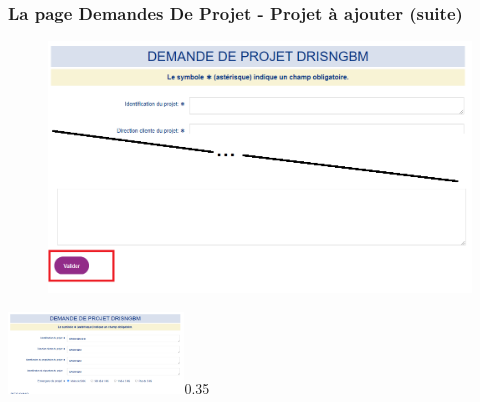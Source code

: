 \documentclass[aspectratio=169]{beamer}%
\let\note\relax
\begin{document}
\begin{frame}
\transwipe 
\label{pictures}
\frametitle{La page Demandes De Projet - Projet à ajouter (suite)}

\begin{figure}
\includegraphics[scale=0.33]{form_valider}
\end{figure}
\end{frame}
\begin{frame}
\transwipe 
  \centering
    \begin{annotate}{\includegraphics[width=0.35\textwidth]{Projet_a_soumettre}}{0.35}
        
    \end{annotate}
    
    \end{frame}
    
\end{document}
